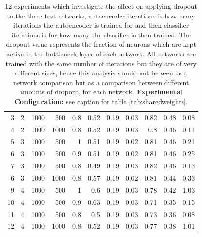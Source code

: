 \begin{table}[h]
{\begin{tabular}{rllrrrrrrrr}
      3                    & 2       & 1000             & 500       & 0.8      & 0.52     & 0.19      & 0.03      & 0.82                 & 0.48                 & 0.08                 \\
      4                    & 2       & 1000             & 1000       & 0.8      & 0.52     & 0.19      & 0.03      & 0.8                  & 0.46                 & 0.11                 \\
      \hline
      5                    & 3       & 1000             & 500       & 1        & 0.51     & 0.19      & 0.02      & 0.81                 & 0.46                 & 0.21                 \\
      6                    & 3       & 1000             & 500       & 0.9      & 0.51     & 0.19      & 0.02      & 0.81                 & 0.46                 & 0.25                 \\
      7                    & 3       & 1000             & 500       & 0.8      & 0.49     & 0.19      & 0.03      & 0.82                 & 0.46                 & 0.13                 \\
      6                    & 3       & 1000             & 1000       & 0.8      & 0.57     & 0.19      & 0.02      & 0.81                 & 0.44                 & 0.33                 \\
      \hline
      9                    & 4       & 1000             & 500       & 1        & 0.6      & 0.19      & 0.03      & 0.78                 & 0.42                 & 1.03                 \\
      10                   & 4       & 1000             & 500       & 0.9      & 0.63     & 0.19      & 0.03      & 0.71                 & 0.35                 & 0.15                 \\
      11                   & 4       & 1000             & 500       & 0.8      & 0.5      & 0.19      & 0.03      & 0.73                 & 0.36                 & 0.08\\
      12                   & 4       & 1000             & 1000       & 0.8      & 0.52      & 0.19      & 0.03      & 0.77   & 0.38     & 1.01\\
      \hline
      \end{tabular}
      }
      \caption{12 experiments which investigate the affect on applying dropout to the
      three test networks, autoencoder iterations is how many iterations
      the autoencoder is trained for and then classifier iterations is for how many the
      classifier is then trained. The dropout value represents the
      fraction of neurons which are kept active in the bottleneck layer of each network.
      All networks are trained with the same number of iterations but they are of very different sizes,
      hence this analysis should not be seen as a network comparison but as a comparison between different amounts of dropout, for each network.
      {\bf Experimental Configuration:} see caption for table \ref{tab:sharedweights}.}
      \label{tab:dropout}
      \end{table}

